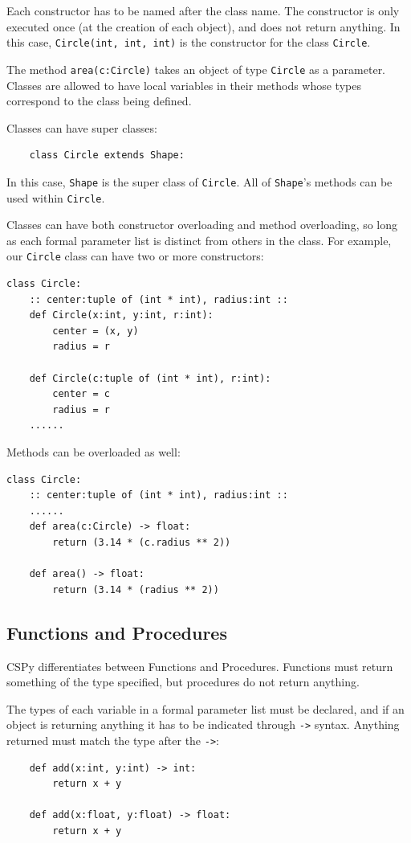 \documentclass{article}
\begin{document}
Each constructor has to be named after the class name. The constructor is only executed once (at the creation of each object), and does not return anything. In this case, \verb|Circle(int, int, int)| is the constructor for the class \verb|Circle|.

The method \verb|area(c:Circle)| takes an object of type \verb|Circle| as a parameter. Classes are allowed to have local variables in their methods whose types correspond to the class being defined.

Classes can have super classes:
\begin{verbatim}
    class Circle extends Shape:
\end{verbatim}
In this case, \verb|Shape| is the super class of \verb|Circle|. All of \verb|Shape|'s methods can be used within \verb|Circle|.

Classes can have both constructor overloading and method overloading, so long as each formal parameter list is distinct from others in the class. For example, our \verb|Circle| class can have two or more constructors:
\begin{verbatim}
class Circle:
    :: center:tuple of (int * int), radius:int ::
    def Circle(x:int, y:int, r:int):
        center = (x, y)
        radius = r

    def Circle(c:tuple of (int * int), r:int):
        center = c
        radius = r
    ......
\end{verbatim}

Methods can be overloaded as well:
\begin{verbatim}
class Circle:
    :: center:tuple of (int * int), radius:int ::
    ......
    def area(c:Circle) -> float:
        return (3.14 * (c.radius ** 2)) 

    def area() -> float:
        return (3.14 * (radius ** 2)) 
\end{verbatim}

\subsection{Functions and Procedures}
CSPy differentiates between Functions and Procedures. Functions must return something of the type specified, but procedures do not return anything.

The types of each variable in a formal parameter list must be declared, and if an object is returning anything it has to be indicated through \verb|->| syntax. Anything returned must match the type after the \verb|->|:
\begin{verbatim}
    def add(x:int, y:int) -> int:
        return x + y

    def add(x:float, y:float) -> float:
        return x + y
\end{verbatim}
\end{document}
